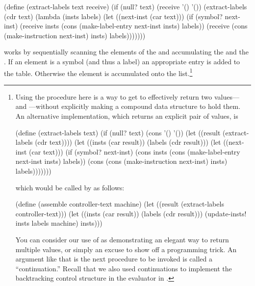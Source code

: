 \begin{codeBlock}
(define (extract-labels text receive)
  (if (null? text)
      (receive '() '())
      (extract-labels
       (cdr text)
       (lambda (insts labels)
         (let ((next-inst (car text)))
           (if (symbol? next-inst)
               (receive insts
                        (cons
                          (make-label-entry next-inst
                                            insts)
                              labels))
               (receive (cons
                          (make-instruction next-inst)
                          insts)
                        labels)))))))
\end{codeBlock}

\noindent
{} works by sequentially scanning the elements of the
 and accumulating the  and the .  If an
element is a symbol (and thus a label) an appropriate entry is added to the
 table. Otherwise the element is accumulated onto the
 list.\footnote{Using the  procedure here is a way to
get  to effectively return two values--- and
---without explicitly making a compound data structure to hold
them.  An alternative implementation, which returns an explicit pair of values,
is

\begin{compactCodeBlock}
(define (extract-labels text)
  (if (null? text)
      (cons '() '())
      (let ((result (extract-labels (cdr text))))
        (let ((insts (car result)) (labels (cdr result)))
          (let ((next-inst (car text)))
            (if (symbol? next-inst)
                (cons insts
                      (cons (make-label-entry next-inst insts)
                            labels))
                (cons (cons (make-instruction next-inst)
                            insts)
                      labels)))))))
\end{compactCodeBlock}

\noindent
which would be called by  as follows:

\begin{compactCodeBlock}
(define (assemble controller-text machine)
  (let ((result (extract-labels controller-text)))
    (let ((insts (car result)) (labels (cdr result)))
      (update-insts! insts labels machine)
      insts)))
\end{compactCodeBlock}

\noindent
You can consider our use of  as demonstrating an elegant way to
return multiple values, or simply an excuse to show off a programming trick.
An argument like  that is the next procedure to be invoked is
called a ``continuation.''  Recall that we also used continuations to implement
the backtracking control structure in the  evaluator in
.}

